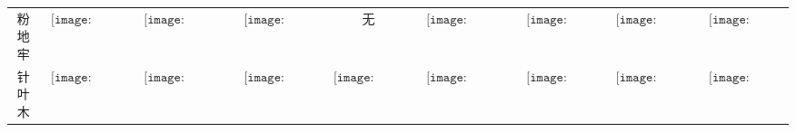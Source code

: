 \begin{longtable}{|c|cccccccc|}
粉地牢&$\begin{array}{c}\texttt{[image: figures/Pink\_Dungeon\_Candle.png]}\end{array}$&$\begin{array}{c}\texttt{[image: figures/Pink\_Dungeon\_Candelabra.png]}\end{array}$&$\begin{array}{c}\texttt{[image: figures/Pink\_Dungeon\_Lamp.png]}\end{array}$&无&$\begin{array}{c}\texttt{[image: figures/Pink\_Dungeon\_Chandelier.png]}\end{array}$&$\begin{array}{c}\texttt{[image: figures/Pink\_Dungeon\_Door.png]}\end{array}$&$\begin{array}{c}\texttt{[image: figures/Pink\_Dungeon\_Toilet.png]}\end{array}$&$\begin{array}{c}\texttt{[image: figures/Pink\_Dungeon\_Chest.png]}\end{array}$\\
针叶木&$\begin{array}{c}\texttt{[image: figures/Boreal\_Wood\_Candle.png]}\end{array}$&$\begin{array}{c}\texttt{[image: figures/Boreal\_Wood\_Candelabra.png]}\end{array}$&$\begin{array}{c}\texttt{[image: figures/Boreal\_Wood\_Lamp.png]}\end{array}$&$\begin{array}{c}\texttt{[image: figures/Boreal\_Wood\_Lantern.png]}\end{array}$&$\begin{array}{c}\texttt{[image: figures/Boreal\_Wood\_Chandelier.png]}\end{array}$&$\begin{array}{c}\texttt{[image: figures/Boreal\_Wood\_Door.png]}\end{array}$&$\begin{array}{c}\texttt{[image: figures/Boreal\_Wood\_Toilet.png]}\end{array}$&$\begin{array}{c}\texttt{[image: figures/Boreal\_Wood\_Chest.png]}\end{array}$\\

\end{longtable}
